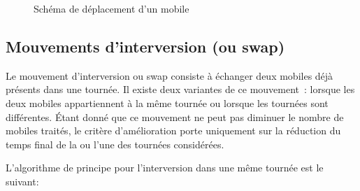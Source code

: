 			\begin{figure}[h!]
			\begin{subfigure}[b]{.54\linewidth}
				\centering
				\begin{tikzpicture}[schema]
					
				\end{tikzpicture}
				\label{subfig:move_move1route}
			\end{subfigure}
			\hfill
			\begin{subfigure}[b]{.45\linewidth}
				\centering
				\begin{tikzpicture}[schema]
					
				\end{tikzpicture}
				\label{subfig:move_move2routes}
			\end{subfigure}
			\caption{Schéma de déplacement d'un mobile}
			\label{fig:move_move}
			\end{figure}

		\subsection{Mouvements d'interversion (ou swap)}
			Le mouvement d'interversion ou swap consiste à échanger deux mobiles déjà présents dans une tournée. Il existe deux variantes de ce mouvement : lorsque les deux mobiles appartiennent à la même tournée ou lorsque les tournées sont différentes. Étant donné que ce mouvement ne peut pas diminuer le nombre de mobiles traités, le critère d'amélioration porte uniquement sur la réduction du temps final de la ou l'une des tournées considérées.

			L'algorithme de principe pour l'interversion dans une même tournée est le suivant:
			\begin{code}
				\begin{algo}[informal]
					\BEGIN
								\ENDFORGEN
							\ENDFORGEN
						\ENDFORGEN
					\END
				\end{algo}
			\end{code}

